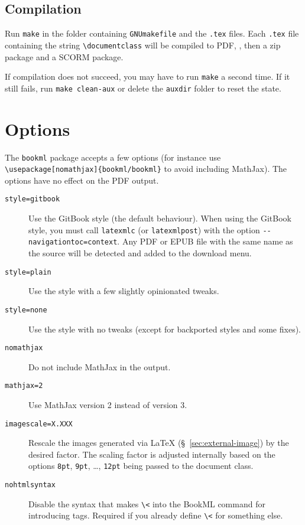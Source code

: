 \documentclass[a4paper,british]{article}
\def\ltxinline{\lstinline[style=bookml]}
\begin{document}
\subsection{Compilation}

Run \ltxinline|make| in the folder containing \texttt{GNUmakefile} and the \texttt{.tex} files. Each \texttt{.tex} file containing the string \ltxinline|\documentclass| will be compiled to PDF, \HTML{}, then a zip package and a SCORM package.

If compilation does not succeed, you may have to run \ltxinline|make| a second time. If it still fails, run \ltxinline|make clean-aux| or delete the \texttt{auxdir} folder to reset the state.

\section{Options}

The \ltxinline|bookml| package accepts a few options (for instance use \ltxinline|\usepackage[nomathjax]{bookml/bookml}| to avoid including MathJax). The options have no effect on the PDF output.

\begin{description}
  \item[\texttt{style=gitbook}] Use the GitBook style (the default behaviour). When using the GitBook style, you must call \ltxinline|latexmlc| (or \ltxinline|latexmlpost|) with the option \ltxinline|--navigationtoc=context|. Any PDF or EPUB file with the same name as the source will be detected and added to the download menu.
  \item[\texttt{style=plain}] Use the \LaTeXML{} style with a few slightly opinionated tweaks.
  \item[\texttt{style=none}] Use the \LaTeXML{} style with no tweaks (except for backported styles and some fixes).
  \item[\texttt{nomathjax}] Do not include MathJax in the output.
  \item[\texttt{mathjax=2}] Use MathJax version 2 instead of version 3.
  \item[\texttt{imagescale=X.XXX}] Rescale the images generated via \LaTeX{} (\S~\ref{sec:external-image}) by the desired factor. The scaling factor is adjusted internally based on the options \ltxinline|8pt|, \ltxinline|9pt|, \dots, \ltxinline|12pt| being passed to the document class.
  \item[\texttt{nohtmlsyntax}] Disable the \HTML{} syntax that makes \ltxinline|\<| into the BookML command for introducing \HTML{} tags. Required if you already define \ltxinline|\<| for something else.
\end{description}
\end{document}
